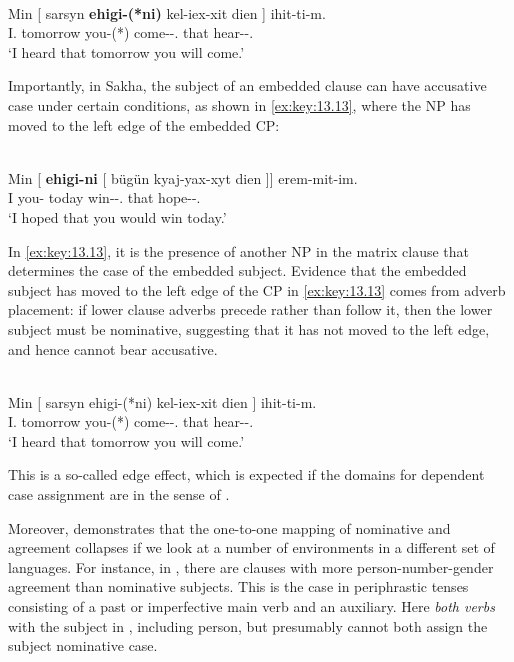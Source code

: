 \documentclass[output=paper]{langsci/langscibook}
\begin{document}
\ea%
    \label{ex:key:13.12} \parencite[113]{Baker2015}\\
    \gll  Min    [ sarsyn \textbf{ehigi-(*ni)}  kel-iex-xit dien ] ihit-ti-m.\\
          I.\Nom{} {} tomorrow you-(*\Acc)  come-\Fut{}-\Spl.\Sbj{}  that {} hear-\Pst{}-\Fsg.\Sbj{}\\
    \glt  ‘I heard that tomorrow you will come.’
\z

Importantly, in Sakha, the subject of an embedded clause can have accusative
case under certain conditions, as shown in \eqref{ex:key:13.13}, where the NP has
moved to the left edge of the embedded CP:

\ea%
    \label{ex:key:13.13} \parencite[114]{Baker2015}\\
    \gll  Min [ \textbf{ehigi-ni} [ bügün kyaj-yax-xyt dien ]]  erem-mit-im.\\
    I {} you-\Acc{} {} today win-\Fut{}-\Tpl.\Sbj{}  that {} hope-\Ptcp{}-\Fsg.\Sbj{}\\
    \glt  ‘I hoped that you would win today.’
\z

In \eqref{ex:key:13.13}, it is the presence of another NP in the matrix clause that
determines the case of the embedded subject. Evidence that the embedded subject
has moved to the left edge of the CP in \eqref{ex:key:13.13} comes from adverb
placement: if lower clause adverbs precede rather than follow it, then the
lower subject must be nominative, suggesting that it has not moved to the left
edge, and hence cannot bear accusative.\newpage

\ea%
    \label{ex:key:13.14} \parencite[115]{Baker2015}\\
    \gll    Min [ sarsyn ehigi-(*ni)  kel-iex-xit dien ]  ihit-ti-m.\\
    I.\Nom{} {} tomorrow you-(*\Acc)  come-\Fut{}-\Spl.\Sbj{} that {} hear-\Pst{}-\Fsg.\Sbj{}\\
    \glt    ‘I heard that tomorrow you will come.’
\z

This is a so-called edge effect, which is expected if the domains for dependent
case assignment are  in the sense of
\citet{Chomsky2001}.

Moreover, \citet{Baker2015} demonstrates that the one-to-one mapping of
nominative and agreement collapses if we look at a number of environments in a
different set of languages. For instance, in , there are clauses
with more person-number-gender agreement than nominative subjects. This is the
case in periphrastic tenses consisting of a past or imperfective main verb and
an auxiliary. Here \emph{both verbs}  with the subject in
, including person, but presumably cannot both assign the
subject nominative case.
\end{document}
